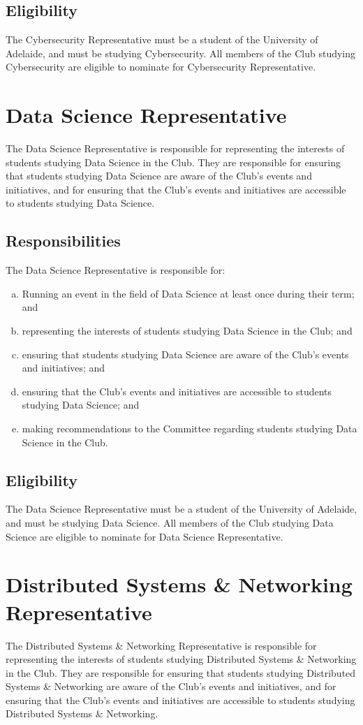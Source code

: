 \documentclass[11pt]{report}
\begin{document}
\subsection{Eligibility}
The Cybersecurity Representative must be a student of the University of Adelaide, and must be studying Cybersecurity. All members of the Club studying Cybersecurity are eligible to nominate for Cybersecurity Representative.

\section{Data Science Representative}
The Data Science Representative is responsible for representing the interests of students studying Data Science in the Club. They are responsible for ensuring that students studying Data Science are aware of the Club's events and initiatives, and for ensuring that the Club's events and initiatives are accessible to students studying Data Science.
\subsection{Responsibilities}
The Data Science Representative is responsible for:
\begin{enumerate}[(a)]
    \item Running an event in the field of Data Science at least once during their term; and
    \item representing the interests of students studying Data Science in the Club; and
    \item ensuring that students studying Data Science are aware of the Club's events and initiatives; and
    \item ensuring that the Club's events and initiatives are accessible to students studying Data Science; and
    \item making recommendations to the Committee regarding students studying Data Science in the Club.
\end{enumerate}
\subsection{Eligibility}
The Data Science Representative must be a student of the University of Adelaide, and must be studying Data Science. All members of the Club studying Data Science are eligible to nominate for Data Science Representative.

\section{Distributed Systems \& Networking Representative}
The Distributed Systems \& Networking Representative is responsible for representing the interests of students studying Distributed Systems \& Networking in the Club. They are responsible for ensuring that students studying Distributed Systems \& Networking are aware of the Club's events and initiatives, and for ensuring that the Club's events and initiatives are accessible to students studying Distributed Systems \& Networking.
\end{document}
